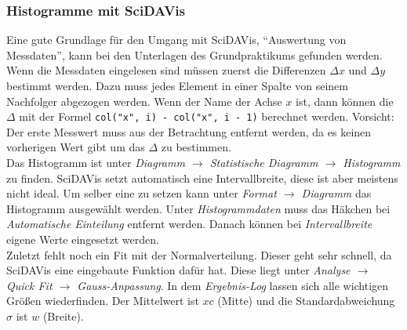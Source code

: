 \subsubsection*{Histogramme mit SciDAVis}
Eine gute Grundlage für den Umgang mit SciDAVis, ``Auswertung von Messdaten'', kann bei den Unterlagen des Grundpraktikums gefunden werden.\\
Wenn die Messdaten eingelesen sind müssen zuerst die Differenzen $\Delta x$ und $\Delta y$ bestimmt werden. Dazu muss jedes Element in einer Spalte von seinem Nachfolger abgezogen werden. Wenn der Name der Achse $x$ ist, dann können die $\Delta$ mit der Formel \verb|col("x", i) - col("x", i - 1)| berechnet werden. Vorsicht: Der erste Messwert muss aus der Betrachtung entfernt werden, da es keinen vorherigen Wert gibt um das $\Delta$ zu bestimmen.\\
Das Histogramm ist unter \emph{Diagramm $\rightarrow$ Statistische Diagramm $\rightarrow$ Histogramm} zu finden. SciDAVis setzt automatisch eine Intervallbreite, diese ist aber meistens nicht ideal. Um selber eine zu setzen kann unter \emph{Format $\rightarrow$ Diagramm} das Histogramm ausgewählt werden. Unter \emph{Histogrammdaten} muss das Häkchen bei \emph{Automatische Einteilung} entfernt werden. Danach können bei \emph{Intervallbreite} eigene Werte eingesetzt werden.\\
Zuletzt fehlt noch ein Fit mit der Normalverteilung. Dieser geht sehr schnell, da SciDAVis eine eingebaute Funktion dafür hat. Diese liegt unter \emph{Analyse $\rightarrow$ Quick Fit $\rightarrow$ Gauss-Anpassung}. In dem \emph{Ergebnis-Log} lassen sich alle wichtigen Größen wiederfinden. Der Mittelwert ist $xc$ (Mitte) und die Standardabweichung $\sigma$ ist $w$ (Breite).
